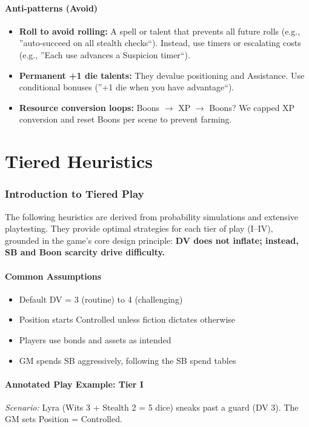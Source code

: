 \documentclass[11pt]{article}
\begin{document}
\subsection{Anti-patterns (Avoid)}
\begin{itemize}
    \item \textbf{Roll to avoid rolling:} A spell or talent that prevents all future rolls (e.g., ''auto-succeed on all stealth checks``). Instead, use timers or escalating costs (e.g., ''Each use advances a Suspicion timer``).
    \item \textbf{Permanent +1 die talents:} They devalue positioning and Assistance. Use conditional bonuses (''+1 die when you have advantage``).
    \item \textbf{Resource conversion loops:} Boons $\rightarrow$ XP $\rightarrow$ Boons? We capped XP conversion and reset Boons per scene to prevent farming.
\end{itemize}

\newpage

\part{Tiered Heuristics}

\section{Introduction to Tiered Play}

The following heuristics are derived from probability simulations and extensive playtesting. They provide optimal strategies for each tier of play (I--IV), grounded in the game's core design principle: \textbf{DV does not inflate; instead, SB and Boon scarcity drive difficulty.}

\subsection{Common Assumptions}
\begin{itemize}
    \item Default DV = 3 (routine) to 4 (challenging)
    \item Position starts Controlled unless fiction dictates otherwise
    \item Players use bonds and assets as intended
    \item GM spends SB aggressively, following the SB spend tables
\end{itemize}

\subsection{Annotated Play Example: Tier I}
\label{ex:tier1}
\textit{Scenario:} Lyra (Wits 3 + Stealth 2 = 5 dice) sneaks past a guard (DV 3). The GM sets Position = Controlled.
\end{document}
